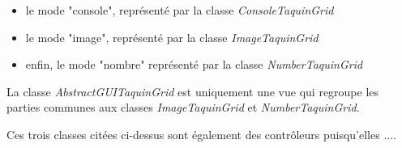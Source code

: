 	\begin{itemize}
		\item le mode "console", représenté par la classe \textit{ConsoleTaquinGrid}
		\item le mode "image", représenté par la classe \textit{ImageTaquinGrid}
		\item enfin, le mode "nombre" représenté par la classe \textit{NumberTaquinGrid}
	\end{itemize}

	La classe \textit{AbstractGUITaquinGrid} est uniquement une vue qui regroupe les parties communes aux classes \textit{ImageTaquinGrid} et \textit{NumberTaquinGrid}.

	Ces trois classes citées ci-dessus sont également des contrôleurs puisqu'elles ....
